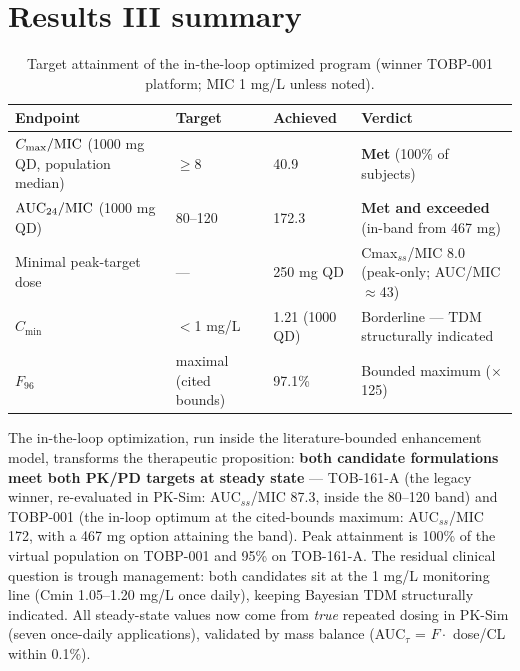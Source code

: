 \section{Results III summary}
\begin{table}[htbp]
\centering
\caption{Target attainment of the in-the-loop optimized program (winner TOBP-001 platform; MIC 1 mg/L unless noted).}
\label{tab:res-targets-v3}
\footnotesize\setlength{\tabcolsep}{3.5pt}
\begin{tabular}{p{4.6cm}p{2.4cm}p{2.2cm}p{4.4cm}}
\toprule
Endpoint & Target & Achieved & Verdict \\
\midrule
$C_{\max}/\mathrm{MIC}$ (1000 mg QD, population median) & $\geq$8 & 40.9 & \textbf{Met} (100\% of subjects) \\
$\mathrm{AUC}_{24}/\mathrm{MIC}$ (1000 mg QD) & 80--120 & 172.3 & \textbf{Met and exceeded} (in-band from 467 mg) \\
Minimal peak-target dose & --- & 250 mg QD & Cmax$_{ss}$/MIC 8.0 (peak-only; AUC/MIC $\approx$43) \\
$C_{\min}$ & $<$1 mg/L & 1.21 (1000 QD) & Borderline --- TDM structurally indicated \\
$F_{96}$ & maximal (cited bounds) & 97.1\% & Bounded maximum ($\times$125) \\\end{tabular}
\end{table}

The in-the-loop optimization, run inside the literature-bounded enhancement model, transforms the therapeutic proposition: \textbf{both candidate formulations meet both PK/PD targets at steady state} --- TOB-161-A (the legacy winner, re-evaluated in PK-Sim: AUC$_{ss}$/MIC 87.3, inside the 80--120 band) and TOBP-001 (the in-loop optimum at the cited-bounds maximum: AUC$_{ss}$/MIC 172, with a 467 mg option attaining the band). Peak attainment is 100\% of the virtual population on TOBP-001 and 95\% on TOB-161-A. The residual clinical question is trough management: both candidates sit at the 1 mg/L monitoring line (Cmin 1.05--1.20 mg/L once daily), keeping Bayesian TDM structurally indicated. All steady-state values now come from \emph{true} repeated dosing in PK-Sim (seven once-daily applications), validated by mass balance (AUC$_{\tau}$ = $F \cdot$ dose/CL within 0.1\%).
